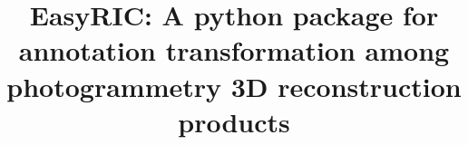 \documentclass[doublespacing]{configs/bmcart}
\begin{document}
\begin{frontmatter}

\begin{fmbox}


\title{EasyRIC: A python package for annotation transformation among photogrammetry 3D reconstruction products}


\author[
   addressref={aff1},
]{ }
\author[
   addressref={aff1},
   corref={aff1}, 
   email={guowei@g.ecc.u-tokyo.ac.jp}
]{ }


\address[id=aff1]{
  , 
  , 
}



\end{fmbox}
\end{frontmatter}
\end{document}
